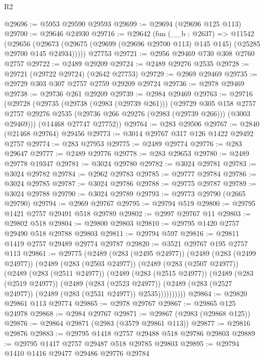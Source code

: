 \begin{lexlean}{R2}
\begin{coremodule}
@29696 := @5953 @29590 @29593
@29699 := @29694 (@29696 @125 @113)
@29700 := @29646 @24930
@29716 := @29642
    (fun (__b : @2637) =>
    @11542
      (@29656
        (@29673 (@29675 (@29699 (@29696 @29700 @113) @145 @145) (@25285 @29700 @145 @24934)))))
    @27753
@29721 := @2956 @29469 @730 @308 @2760 @2757
@29722 := @2489 @29209
@29724 := @2489 @29276 @2535
@29728 := @29721 (@29722 @29724) (@2642 @27753)
@29729 := @2969 @29469
@29735 := @29729 @303 @307 @2757 @2759 @29209 @29724
@29736 := @2978 @29469
@29738 := @29736 @261 @29209
@29739 := @2984 @29469
@29763 := @29716
    (@29728
      (@29735
        (@29738 (@2983 (@29739 @261)))
        (@29729
          @305
          @158
          @2757
          @2757
          @29276
          @2535
          (@29736 @266 @29276 (@2983 (@29739 @266)))
          (@3003 @29469)))
      (@14468 @27747 @27752))
@29764 := @283 @29506
@29767 := @2840 (@21468 @29764) @29456
@29773 := @3014 @29767 @317 @126 @1422 @29492 @2757
@29774 := @283 @27953
@29775 := @2489 @29774
@29776 := @283 @29647
@29777 := @2489 @29776
@29778 := @283 @29653
@29780 := @2489 @29778 @19347
@29781 := @3024 @29780
@29782 := @3024 @29781
@29783 := @3024 @29782
@29784 := @2962 @29783
@29785 := @29777 @29784
@29786 := @3024 @29785
@29787 := @3024 @29786
@29788 := @29775 @29787
@29789 := @3024 @29788
@29790 := @3024 @29789
@29793 := @29773 @29790 (@2665 @29790)
@29794 := @2969 @29767
@29795 := @29794 @519
@29800 := @29795 @1421 @2757 @29491 @518 @29789
@29802 := @2997 @29767 @11
@29803 := @29802 @518
@29804 := @29800 @29803
@29810 := @29795 @1420 @2757 @29490 @518 @29788 @29803
@29811 := @29794 @597
@29816 := @29811 @1419 @2757 @29489 @29774 @29787
@29820 := @3521 @29767 @195 @2757 @113
@29861 := @29775
    (@2489
      (@283 (@2495 @24977))
      (@2489
        (@283 (@2499 @24977))
        (@2489
          (@283 (@2503 @24977))
          (@2489
            (@283 (@2507 @24977))
            (@2489
              (@283 (@2511 @24977))
              (@2489
                (@283 (@2515 @24977))
                (@2489
                  (@283 (@2519 @24977))
                  (@2489
                    (@283 (@2523 @24977))
                    (@2489 (@283 (@2527 @24977)) (@2489 (@283 (@2531 @24977)) @2535))))))))))
@29864 := @29820 @29861 @113 @29774
@29865 := @2978 @29767
@29867 := @29865 @125 @24978
@29868 := @2984 @29767
@29871 := @29867 (@2983 (@29868 @125))
@29876 := @29864 @29871 (@2983 (@3579 @29861 @113))
@29877 := @29816 @29876
@29883 := @29795 @1418 @2757 @29488 @518 @29786 @29803
@29889 := @29795 @1417 @2757 @29487 @518 @29785 @29803
@29895 := @29794 @1410 @1416 @29477 @29486 @29776 @29784

\end{coremodule}
\end{lexlean}
